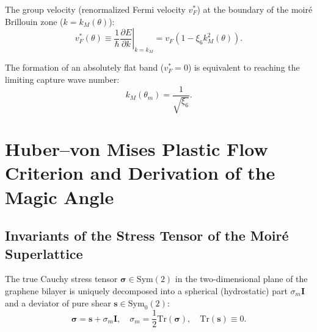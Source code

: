 \documentclass[12pt,a4paper]{article}
\begin{document}
	The group velocity (renormalized Fermi velocity $v_F^*$) at the boundary of the moiré Brillouin zone ($k = k_M(\theta)$):
	\begin{equation}
		v_F^*(\theta) \equiv \frac{1}{\hbar} \left. \frac{\partial E}{\partial k} \right|_{k=k_M} = v_F \left( 1 - \xi_6 k_M^2(\theta) \right).
	\end{equation}
	
	The formation of an absolutely flat band ($v_F^* = 0$) is equivalent to reaching the limiting capture wave number:
	\begin{equation}
		k_M(\theta_m) = \frac{1}{\sqrt{\xi_6}}.
	\end{equation}
	
	\section{Huber--von Mises Plastic Flow Criterion and Derivation of the Magic Angle}
	
	\subsection{Invariants of the Stress Tensor of the Moiré Superlattice}
	The true Cauchy stress tensor $\boldsymbol{\sigma} \in \mathrm{Sym}(2)$ in the two-dimensional plane of the graphene bilayer is uniquely decomposed into a spherical (hydrostatic) part $\sigma_m \mathbf{I}$ and a deviator of pure shear $\mathbf{s} \in \mathrm{Sym}_0(2)$:
	\begin{equation}
		\boldsymbol{\sigma} = \mathbf{s} + \sigma_m \mathbf{I}, \quad \sigma_m = \frac{1}{2} \mathrm{Tr}(\boldsymbol{\sigma}), \quad \mathrm{Tr}(\mathbf{s}) \equiv 0.
	\end{equation}
	
\end{document}
